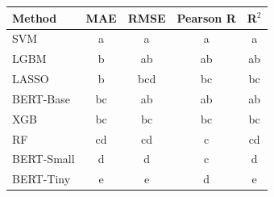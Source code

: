 \begin{tabular}{lcccc}
\toprule
Method & MAE & RMSE & Pearson R & R$^2$ \\
\midrule
SVM & a & a & a & a \\
LGBM & b & ab & ab & ab \\
LASSO & b & bcd & bc & bc \\
BERT-Base & bc & ab & ab & ab \\
XGB & bc & bc & bc & bc \\
RF & cd & cd & c & cd \\
BERT-Small & d & d & c & d \\
BERT-Tiny & e & e & d & e \\
\bottomrule
\end{tabular}
